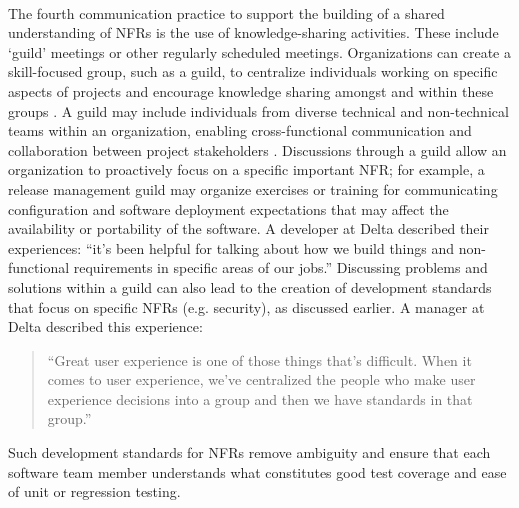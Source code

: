 \documentclass[smallextended]{svjour3}        %
\providecommand{\DIFaddtex}[1]{{\protect\color{blue}\uwave{#1}}} %
\providecommand{\DIFaddbegin}{} %
\providecommand{\DIFaddend}{} %
\providecommand{\DIFadd}[1]{\texorpdfstring{\DIFaddtex{#1}}{#1}} %
\newcommand{\DIFaddincludegraphics}[2][]{{\color{blue}\fbox{\DIFOincludegraphics[#1]{#2}}}} %
\DeclareRobustCommand{\DIFaddbegin}{\DIFOaddbegin \let\includegraphics\DIFaddincludegraphics} %
\DeclareRobustCommand{\DIFaddend}{\DIFOaddend \let\includegraphics\DIFOincludegraphics} %
\begin{document}
\DIFaddbegin \paragraph{\DIFadd{Knowledge-sharing activities}} \DIFaddend The fourth communication practice to support the building of a shared understanding of NFRs is the use of knowledge-sharing activities. These include `guild' meetings or other regularly scheduled meetings.
Organizations can create a skill-focused group, such as a guild, to centralize individuals working on specific aspects of projects and encourage knowledge sharing amongst and within these groups \cite[cf.][]{stol2022gamification}.
A guild may include individuals from diverse technical and non-technical teams within an organization, enabling cross-functional communication and collaboration between project stakeholders \citep{cooper2018}. 
Discussions through a guild allow an organization to proactively focus on a specific important NFR; for example, a release management guild may organize exercises or training for communicating configuration and software deployment expectations that may affect the availability or portability of the software. A developer at Delta described their experiences:
\textmd{``it's been helpful for talking about how we build things and non-functional requirements in specific areas of our jobs.''}
Discussing problems and solutions within a guild can also lead to the creation of development standards that focus on specific NFRs (e.g. security), as discussed earlier. 
A manager at Delta described this experience:
\begin{quote}
    ``Great user experience is one of those things that’s difficult. When it comes to user experience, we've centralized the people who make user experience decisions into a group and then we have standards in that group.''   
\end{quote}
Such development standards for NFRs remove ambiguity and ensure that each software team member understands what constitutes good test coverage and ease of unit or regression testing.  
\end{document}
